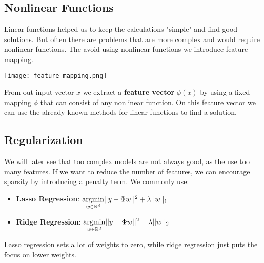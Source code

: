 \subsection{Nonlinear Functions}

Linear functions helped us to keep the calculations "simple" and find good solutions. But often there are problems that are more complex and would require nonlinear functions. The avoid using nonlinear functions we introduce feature mapping. 

\texttt{[image: feature-mapping.png]}

From out input vector $x$ we extract a \textbf{feature vector} $\phi(x)$ by using a fixed mapping $\phi$ that can consist of any nonlinear function. On this feature vector we can use the already known methods for linear functions to find a solution.

\subsection{Regularization}

We will later see that too complex models are not always good, as the use too many features. If we want to reduce the number of features, we can encourage sparsity by introducing a penalty term. We commonly use:
\begin{itemize}
	\item \textbf{Lasso Regression}: $\underset{w \in \mathbb{R}^d}{\text{argmin}} ||y - \Phi w||^2 + \lambda ||w||_1$
	\item \textbf{Ridge Regression}: $\underset{w \in \mathbb{R}^d}{\text{argmin}} ||y - \Phi w||^2 + \lambda ||w||_2$
\end{itemize}

Lasso regression sets a lot of weights to zero, while ridge regression just puts the focus on lower weights.